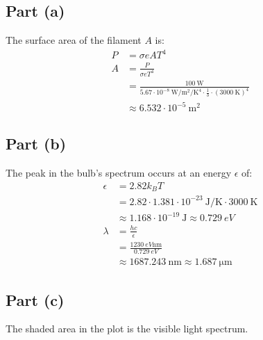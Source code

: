 \documentclass{article}
\begin{document}
\clearpage

\subsection*{Part (a)}
The surface area of the filament $A$ is:
\begin{equation}
    \begin{split}
        P & = \sigma e AT^4 \\
        A & = \frac{P}{\sigma e T^4} \\
        & = \frac{100~\unit{\watt}}{5.67 \cdot 10^{-8}~\unit{\watt\per\meter\squared\per\kelvin\tothe{4}} \cdot \frac{1}{3} \cdot {\left(3000~\unit{\kelvin}\right)}^4} \\
        & \approx 6.532 \cdot 10^{-5}~\unit{\meter\squared}
    \end{split}
\end{equation}
\subsection*{Part (b)}
The peak in the bulb's spectrum occurs at an energy $\epsilon$ of:
\begin{equation}
    \begin{split}
        \epsilon & = 2.82k_BT \\
        & = 2.82 \cdot 1.381 \cdot 10^{-23}~\unit{\joule\per\kelvin} \cdot 3000~\unit{\kelvin} \\
        & \approx 1.168 \cdot 10^{-19}~\unit{\joule} \approx 0.729~\unit{eV} \\
        \lambda & = \frac{hc}{\epsilon} \\
        & = \frac{1230~\unit{eV \nano\meter}}{0.729~\unit{eV}} \\
        & \approx 1687.243~\unit{\nano\meter} \approx 1.687~\unit{\micro\meter}
    \end{split}
\end{equation}
\subsection*{Part (c)}
The shaded area in the plot is the visible light spectrum.
\begin{center}
\end{center}
\end{document}
